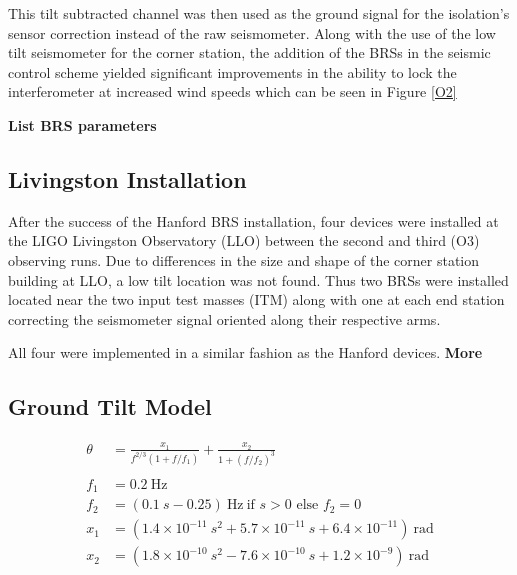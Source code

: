\documentclass [12pt, proquest]{uwthesis}[2019]
\begin{document}
This tilt subtracted channel was then used as the ground signal for the isolation's sensor correction instead of the raw seismometer. Along with the use of the low tilt seismometer for the corner station, the addition of the BRSs in the seismic control scheme yielded significant improvements in the ability to lock the interferometer at increased wind speeds which can be seen in Figure \ref{O2}

\textbf{List BRS parameters}


\subsection{Livingston Installation}

\quad After the success of the Hanford BRS installation, four devices were installed at the LIGO Livingston Observatory (LLO) between the second and third (O3) observing runs. Due to differences in the size and shape of the corner station building at LLO, a low tilt location was not found. Thus two BRSs were installed located near the two input test masses (ITM) along with one at each end station correcting the seismometer signal oriented along their respective arms. 

All four were implemented in a similar fashion as the Hanford devices. \textbf{More}

\subsection{Ground Tilt Model}

\begin{align}
\theta&=\frac{x_1}{f^{2/3}(1+f/f_1)} +\frac{x_2}{1+(f/f_2)^3}\label{TiltModelEq}\\
\nonumber \\ 
f_1&=0.2\ \text{Hz}\nonumber \\
f_2&=(0.1\ s -0.25)\ \text{Hz}\ \text{if }s>0\text{ else }f_2=0\nonumber \\
x_1&=(1.4\times10^{-11}\ s^2+5.7\times10^{-11}\ s+6.4\times10^{-11})\ \text{rad}\nonumber \\
x_2&=(1.8\times10^{-10}\ s^2-7.6\times10^{-10}\ s+1.2\times10^{-9})\ \text{rad}\nonumber
\end{align}
\end{document}
